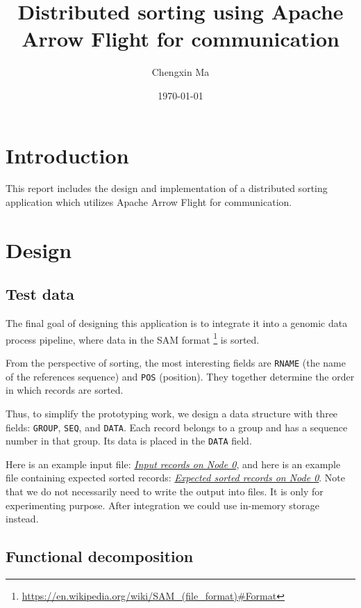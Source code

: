 \documentclass{article}
\title{Distributed sorting using Apache Arrow Flight for communication}
\author{Chengxin Ma}
\date{\today}
\begin{document}
\maketitle

\section{Introduction}
This report includes the design and implementation of a distributed sorting application which utilizes Apache Arrow Flight for communication.

\section{Design}
\subsection{Test data}
The final goal of designing this application is to integrate it into a genomic data process pipeline, where data in the SAM format
\footnote{\url{https://en.wikipedia.org/wiki/SAM_(file_format)\#Format}} is sorted.

From the perspective of sorting, the most interesting fields are \texttt{RNAME} (the name of the references sequence) and \texttt{POS} (position).
They together determine the order in which records are sorted.

Thus, to simplify the prototyping work, we design a data structure with three fields: \texttt{GROUP}, \texttt{SEQ}, and \texttt{DATA}.
Each record belongs to a group and has a sequence number in that group.
Its data is placed in the \texttt{DATA} field.

Here is an example input file: \href{https://github.com/MaChengxin/playground/blob/master/arrow/flight/my_flight/data/4_nodes/records_on_node_0.txt}{\textit{Input records on Node 0}},
and here is an example file containing expected sorted records: \href{https://github.com/MaChengxin/playground/blob/master/arrow/flight/my_flight/data/4_nodes/expected_records_on_node_0.txt}{\textit{Expected sorted records on Node 0}}.
Note that we do not necessarily need to write the output into files.
It is only for experimenting purpose.
After integration we could use in-memory storage instead.

\subsection{Functional decomposition}
\end{document}
